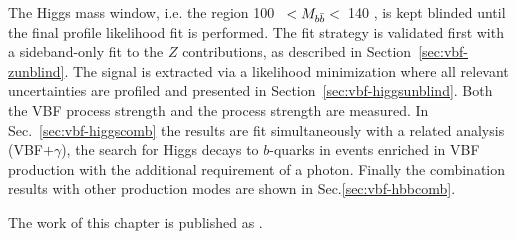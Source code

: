 The Higgs mass window, i.e. the region 100 \GeV~$< M_{b\bar{b}}<$~140 \GeV, is kept blinded until the final profile likelihood fit is performed.  The fit strategy is validated first with a sideband-only fit to the $Z$ contributions, as described in Section~\ref{sec:vbf-zunblind}. The signal is extracted via a likelihood minimization where all relevant uncertainties are profiled and presented in Section~\ref{sec:vbf-higgsunblind}. Both the VBF process strength and the \Hbb process strength are measured. In Sec.~\ref{sec:vbf-higgscomb} the results are fit simultaneously with a related analysis (VBF$+\gamma$), the search for Higgs decays to $b$-quarks in events enriched in VBF production with the additional requirement of a photon. Finally the combination results with other \Hbb production modes are shown in Sec.\ref{sec:vbf-hbbcomb}.

The work of this chapter is published as \cite{vbfmypaper}. 







